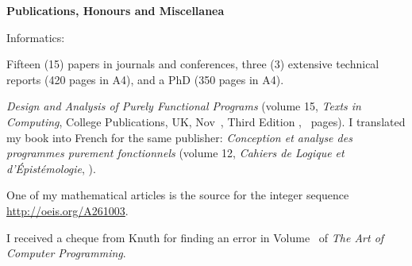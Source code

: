 \documentclass[a4paper,11pt]{article}
\begin{document}








\newpage
\noindent\textbf{\large Publications, Honours and Miscellanea}

\bigskip

\noindent Informatics:
\begin{itemize*}

  \item Fifteen (15) papers in journals and conferences, three (3)
    extensive technical reports (420 pages in A4), and a PhD (350
    pages in A4).

  \item \textit{Design and Analysis of Purely Functional Programs}
    (volume 15, \emph{Texts in Computing}, College Publications, UK,
    Nov~, Third Edition ,
    ~pages). I translated my book into French for
    the same publisher: \textit{Conception et analyse des programmes
      purement fonctionnels} (volume 12, \emph{Cahiers de Logique et
    d'Épistémologie}, ).

  \item One of my mathematical articles is the source for the integer
    sequence \url{http://oeis.org/A261003}.

  \item I received a cheque from Knuth for finding an error in
    Volume~ of \emph{The Art of Computer Programming}.

\end{itemize*}
\end{document}
